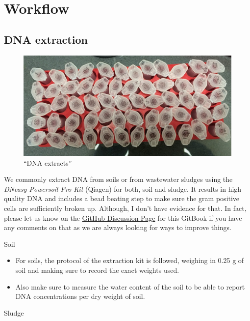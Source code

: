\documentclass[
]{book}
\providecommand{\tightlist}{%
  \setlength{\itemsep}{0pt}\setlength{\parskip}{0pt}}
\begin{document}
\hypertarget{workflow}{%
\section{Workflow}\label{workflow}}

\hypertarget{dna-extraction}{%
\subsection{DNA extraction}\label{dna-extraction}}

\begin{figure}
\centering
\includegraphics{./img/dna.jpeg}
\caption{``DNA extracts''}
\end{figure}

We commonly extract DNA from soils or from wastewater sludges using the \emph{DNeasy Powersoil Pro Kit} (Qiagen) for both, soil and sludge. It results in high quality DNA and includes a bead beating step to make sure the gram positive cells are sufficiently broken up. Although, I don't have evidence for that. In fact, please let us know on the \href{https://github.com/chrismitbiz/ABlab-workflows/discussions}{GitHub Discussion Page} for this GitBook if you have any comments on that as we are always looking for ways to improve things.

Soil

\begin{itemize}
\tightlist
\item
  For soils, the protocol of the extraction kit is followed, weighing in 0.25 g of soil and making sure to record the exact weights used.\\
\item
  Also make sure to measure the water content of the soil to be able to report DNA concentrations per dry weight of soil.
\end{itemize}

Sludge
\end{document}
